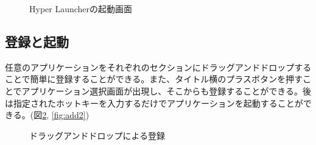 \begin{figure}[h]
    \begin{center}
    \end{center}
    \caption{Hyper Launcherの起動画面}
    \label{fig:hyper-launcher}
\end{figure}

\subsection{登録と起動}

任意のアプリケーションをそれぞれのセクションにドラッグアンドドロップすることで簡単に登録することができる。また、タイトル横のプラスボタンを押すことでアプリケーション選択画面が出現し、そこからも登録することができる。後は指定されたホットキーを入力するだけでアプリケーションを起動することができる。(図\ref{fig:add1}, \ref{fig:add2})

\begin{figure}[h]
    \begin{center}
    \end{center}
    \caption{ドラッグアンドドロップによる登録}
    \label{fig:add1}
\end{figure}

